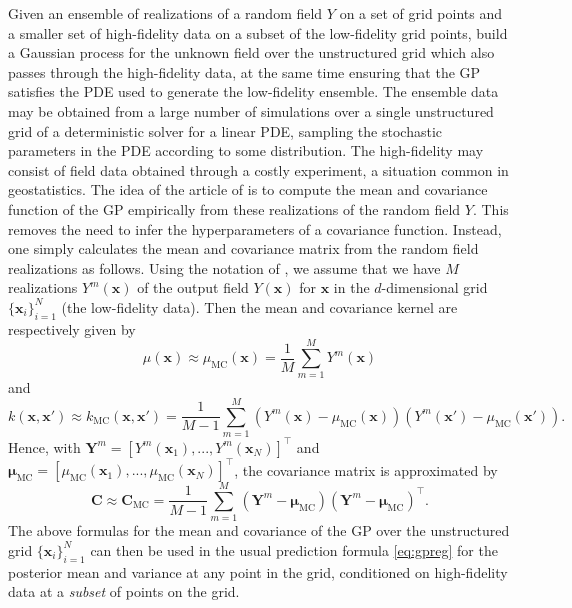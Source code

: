 \label{sec:empirical}
Given an ensemble of realizations of a random field $Y$  on a set of grid points and a smaller set of high-fidelity data on a subset of the low-fidelity grid points, 
 build a Gaussian process for the unknown field over the unstructured grid which also passes through the high-fidelity data, at the same time ensuring that the GP satisfies the PDE used to generate the low-fidelity ensemble. The ensemble data may be obtained from a large number of simulations over a single unstructured grid of a deterministic solver for a linear PDE, sampling the stochastic parameters in the PDE according to some distribution. The high-fidelity may consist of field data obtained through a costly experiment, a situation common in geostatistics.
The idea of the article of  is to compute the mean and covariance function of the GP empirically from these realizations of the random field $Y$.  This removes the need to infer the hyperparameters of a
covariance function.  Instead, one simply calculates the mean and covariance matrix 
from the random field realizations as follows.  Using the notation of , we 
assume that we have $M$ realizations $Y^m(\mathbf{x})$ of the output field $Y(\mathbf{x})$ for $\mathbf{x}$ in the $d$-dimensional grid 
$\{\mathbf{x}_i\}_{i=1}^N$ (the low-fidelity data). Then the mean and covariance kernel are respectively given by
\begin{equation}
\mu(\mathbf{x}) \approx \mu_{\text{MC}}(\mathbf{x})=\frac{1}{M}\sum_{m=1}^{M}Y^m(\mathbf{x})
\end{equation} 
and
\begin{equation}
k(\mathbf{x},\mathbf{x}') \approx k_{\text{MC}}(\mathbf{x},\mathbf{x}')=\frac{1}{M-1}\sum_{m=1}^{M}{(Y^m(\mathbf{x})-\mu_{\text{MC}}(\mathbf{x}))(Y^m(\mathbf{x}')-\mu_{\text{MC}}(\mathbf{x}'))}.
\end{equation}
Hence, with $\mathbf{Y}^m = [Y^m(\mathbf{x}_1), ..., Y^m(\mathbf{x}_N)]^\top$ and $\bm{\mu}_{\text{MC}} = [\mu_{\text{MC}}(\mathbf{x}_1), ..., \mu_{\text{MC}}(\mathbf{x}_N)]^\top$, the covariance matrix is approximated by
\begin{equation}
\mathbf{C} \approx \mathbf{C}_{\text{MC}}=\frac{1}{M-1}\sum_{m=1}^{M}{(\mathbf{Y}^m-\boldsymbol{\mu}_{\text{MC}})(\mathbf{Y}^m-\boldsymbol{\mu}_{\text{MC}})^\top}.
\end{equation}
The above formulas for the mean and covariance of the GP over the unstructured grid $\{\mathbf{x}_i\}_{i=1}^N$ can then be used in the usual prediction formula \eqref{eq:gpreg} for the posterior mean and variance at any point in the grid, conditioned on high-fidelity data at a \emph{subset} of points on the grid. 
